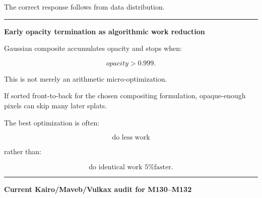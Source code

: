 The correct response follows from data distribution.

\begin{center}\rule{0.5\linewidth}{0.5pt}\end{center}

\textbf{Early opacity termination as algorithmic work reduction}

Gaussian composite accumulates opacity and stops when:

\[
opacity>0.999.
\]

This is not merely an arithmetic micro-optimization.

If sorted front-to-back for the chosen compositing formulation, opaque-enough pixels can skip many later splats.

The best optimization is often:

\[
\boxed{
\text{do less work}
}
\]

rather than:

\[
\text{do identical work 5\% faster}.
\]

\begin{center}\rule{0.5\linewidth}{0.5pt}\end{center}

\textbf{Current Kairo/Maveb/Vulkax audit for M130--M132}

